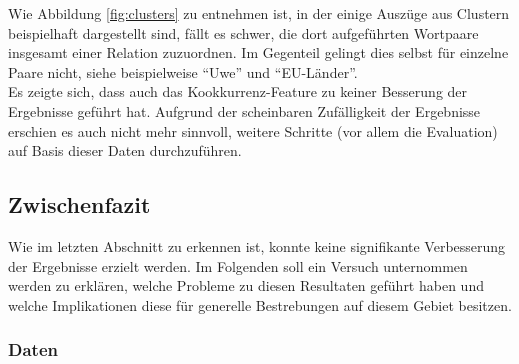 Wie Abbildung \ref{fig:clusters} zu entnehmen ist, in der einige Auszüge aus Clustern beispielhaft dargestellt sind,
fällt es schwer, die dort aufgeführten Wortpaare insgesamt einer Relation zuzuordnen. Im Gegenteil gelingt dies selbst für
einzelne Paare nicht, siehe beispielweise ``Uwe'' und ``EU-Länder''.\\

Es zeigte sich, dass auch das Kookkurrenz-Feature zu keiner Besserung der Ergebnisse geführt hat. Aufgrund der scheinbaren
Zufälligkeit der Ergebnisse erschien es auch nicht mehr sinnvoll, weitere Schritte (vor allem die Evaluation) auf Basis dieser Daten
durchzuführen.\\

\subsection{Zwischenfazit}\label{sec:zwi-dis}

Wie im letzten Abschnitt zu erkennen ist, konnte keine signifikante Verbesserung der Ergebnisse erzielt werden.
Im Folgenden soll ein Versuch unternommen werden zu erklären, welche Probleme zu diesen Resultaten geführt haben und welche
Implikationen diese für generelle Bestrebungen auf diesem Gebiet besitzen.

\subsubsection{Daten}\label{sec:zwi-dis-data}

